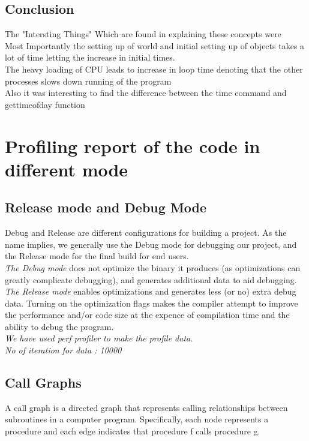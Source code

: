 \documentclass[11pt,]{article}
\begin{document}
\begin{singlespace}
\subsection{Conclusion}
The "Intersting Things" Which are found in explaining these concepts were \\
Most Importantly the setting up of world and initial setting up of objects takes a lot of time letting the increase in initial times.\\
The heavy loading of CPU leads to increase in loop time denoting that the other processes slows down running of the program\\
Also it was interesting to find the difference between the time command and gettimeofday function
	
\newpage
\section{Profiling report of the code in different mode}
\subsection{Release mode and Debug Mode}
Debug and Release are different configurations for building a project.
 As the name implies, we generally use the Debug mode for debugging our project,
  and the Release mode for the final build for end users.\\
 \emph{The Debug mode} does not optimize the binary it produces (as optimizations can greatly complicate debugging), 
 and generates additional data to aid debugging.\\
 \emph{The Release mode} enables optimizations and generates less (or no) extra debug data. Turning on the optimization flags makes the compiler 
 attempt to improve the performance and/or code size at the expence of compilation time and the ability to debug the program.\\
 
 \emph{We have used perf profiler to make the profile data.}\\
 \emph{No of iteration for data : 10000}

\subsection{Call Graphs}
A call graph is a directed graph that represents calling relationships between subroutines in a computer program.
Specifically, each node represents a procedure and each edge indicates that procedure f calls procedure g.\\


\end{singlespace}
\end{document}

